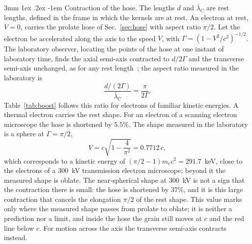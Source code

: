 \documentclass[%
 reprint, amsmath,amssymb, aps, prb, ]{revtex4-2}
\makeatletter
\numberwithin{equation}{section}
\renewcommand\paragraph{%
  \@startsection{paragraph}{4}{\z@}%
    {3mm \@plus 1ex \@minus .2ex}%
    {-1em}%
    {\normalfont\normalsize\itshape}}
\newcommand{\lbar}{\bar{\lambda}_C}
\makeatother
\begin{document}
\paragraph{Contraction of the hose.} The lengths $d$ and $\lbar$ are rest lengths, defined in the frame in which the kernels are at rest. An electron at rest, $V = 0$, carries the prolate hose of Sec.~\ref{sec:hose} with aspect ratio $\pi/2$. Let the electron be accelerated along the axis to the speed $V$, with $\Gamma = (1 - V^2/c^2)^{-1/2}$. The laboratory observer, locating the points of the hose at one instant of laboratory time, finds the axial semi-axis contracted to $d/2\Gamma$ and the transverse semi-axis unchanged, as for any rest length~\cite{H51}; the aspect ratio measured in the laboratory is
\begin{equation}
\frac{d/(2\Gamma)}{\lbar} = \frac{\pi}{2\Gamma} .
\label{eq:aspectV}
\end{equation}
Table~\ref{tab:boost} follows this ratio for electrons of familiar kinetic energies. A thermal electron carries the rest shape. For an electron of a scanning electron microscope the hose is shortened by $5.5\%$. The shape measured in the laboratory is a sphere at $\Gamma = \pi/2$,
\begin{equation}
V = c\sqrt{1 - \frac{4}{\pi^2}} = 0.7712\,c ,
\label{eq:sphere}
\end{equation}
which corresponds to a kinetic energy of $(\pi/2 - 1)m_ec^2 = 291.7$~keV, close to the electrons of a $300$~kV transmission electron microscope; beyond it the measured shape is oblate. The near-spherical shape at $300$~kV is not a sign that the contraction there is small: the hose is shortened by $37\%$, and it is this large contraction that cancels the elongation $\pi/2$ of the rest shape. This value marks only where the measured shape passes from prolate to oblate; it is neither a prediction nor a limit, and inside the hose the grain still moves at $c$ and the red line below $c$. For motion across the axis the transverse semi-axis contracts instead.
\end{document}
